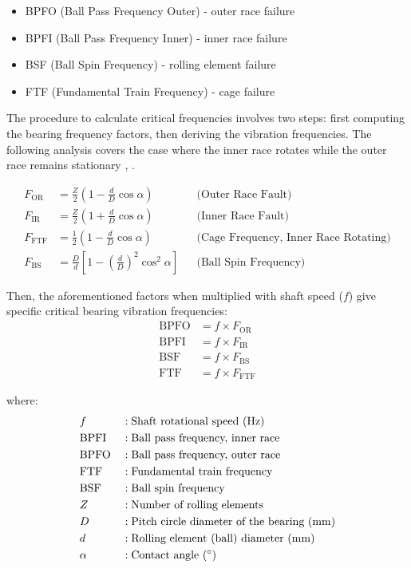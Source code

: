 {{{\begin{itemize}
	\item BPFO (Ball Pass Frequency Outer) - outer race failure
	\item BPFI (Ball Pass Frequency Inner) - inner race failure
	\item BSF (Ball Spin Frequency) - rolling element failure
	\item FTF (Fundamental Train Frequency) - cage failure
\end{itemize}



The procedure to calculate critical frequencies involves two steps: first computing the bearing frequency factors, then deriving the vibration frequencies. The following analysis covers the case where the inner race rotates while the outer race remains stationary \cite{Li2001}, \cite{Betta2002}.

\begin{align}
	F_{\text{OR}} &= \frac{Z}{2} \left(1 - \frac{d}{D} \cos\alpha\right) 
	&&\text{(Outer Race Fault)} \label{eq:OR} \\
	F_{\text{IR}} &= \frac{Z}{2} \left(1 + \frac{d}{D} \cos\alpha\right) 
	&&\text{(Inner Race Fault)} \label{eq:IR} \\
	F_{\text{FTF}} &= \frac{1}{2} \left(1 - \frac{d}{D} \cos\alpha\right) 
	&&\text{(Cage Frequency, Inner Race Rotating)} \label{eq:FT} \\
	F_{\text{BS}} &= \frac{D}{d} \left[1 - \left(\frac{d}{D}\right)^2 \cos^2\alpha\right] 
	&&\text{(Ball Spin Frequency)} \label{eq:BS}
\end{align}

Then, the aforementioned factors when multiplied with shaft speed ($f$) give specific critical bearing vibration frequencies:
\begin{align}
	\text{BPFO} &= f \times F_{\text{OR}} \label{eq:BPFO} \\
	\text{BPFI} &= f \times F_{\text{IR}} \label{eq:BPFI} \\
	\text{BSF}  &= f \times F_{\text{BS}} \label{eq:BSF} \\
	\text{FTF}  &= f \times F_{\text{FTF}} \label{eq:FTF}
\end{align}

where:
\begin{align*}
	&f    &&: \text{Shaft rotational speed (\si{\hertz})} \\
	&\text{BPFI} &&: \text{Ball pass frequency, inner race} \\
	&\text{BPFO} &&: \text{Ball pass frequency, outer race} \\
	&\text{FTF}  &&: \text{Fundamental train frequency} \\
	&\text{BSF}  &&: \text{Ball spin frequency} \\
	&Z    &&: \text{Number of rolling elements} \\
	&D    &&: \text{Pitch circle diameter of the bearing (\si{\milli\meter})} \\
	&d    &&: \text{Rolling element (ball) diameter (\si{\milli\meter})} \\
	&\alpha &&: \text{Contact angle (\si{\degree})} \\
\end{align*}

}}}
